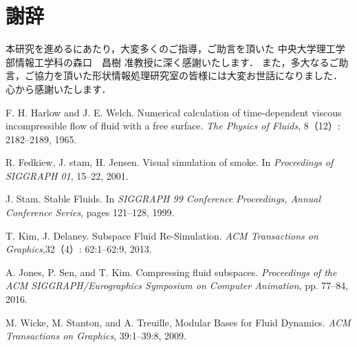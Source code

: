 \documentclass[a4j,12pt]{jreport}
\def\syaji{ \chapter*{謝辞} \addcontentsline{toc}{chapter}{謝辞}}
\begin{document}
\syaji
\par
本研究を進めるにあたり，大変多くのご指導，ご助言を頂いた
中央大学理工学部情報工学科の森口　昌樹 准教授に深く感謝いたします．
また，多大なるご助言，ご協力を頂いた形状情報処理研究室の皆様には大変お世話になりました．
心から感謝いたします．


\begin{thebibliography}{99}
F. H. Harlow and J. E. Welch. Numerical calculation of time-dependent viscous incompressible flow of fluid with a free surface. \textit{The Physics of Fluids}, 8（12）: 2182--2189, 1965.

R. Fedkiew, J. stam, H. Jensen. Visual simulation of smoke. In \textit{Proceedings of SIGGRAPH 01}, 15--22, 2001.

J. Stam. Stable Fluids. In \textit{SIGGRAPH 99 Conference Proceedings, Annual Conference Series}, pages 121--128, 1999.

T. Kim, J. Delaney. Subspace Fluid Re-Simulation. \textit{ACM Transactions on Graphics},32（4）: 62:1--62:9, 2013.

A. Jones, P. Sen, and T. Kim. Compressing fluid subspaces. \textit{Proceedings of the ACM SIGGRAPH/Eurographics Symposium on Computer Animation}, pp. 77--84, 2016.

M. Wicke, M. Stanton, and A. Treuille, Modular Bases for Fluid Dynamics. \textit{ACM Transactions on Graphics}, 39:1--39:8, 2009.

\end{thebibliography}



            
\end{document}
